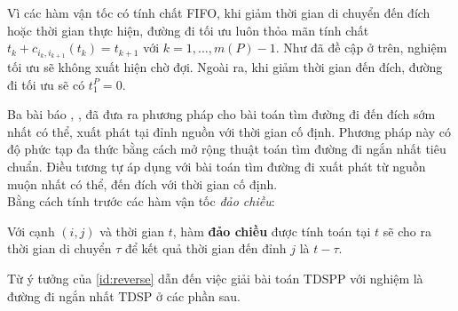\documentclass[../main.tex]{subfiles}
\begin{document}
Vì các hàm vận tốc có tính chất FIFO, khi giảm thời gian di
chuyển đến đích hoặc thời gian thực hiện, đường đi tối ưu luôn thỏa mãn
tính chất \(t_k + c_{i_k, i_{k+1}}(t_k) = t_{k+1}\) với
\(k = 1, \dots, m(P)-1\). Như đã đề cập ở trên, nghiệm tối ưu sẽ không
xuất hiện chờ đợi. Ngoài ra, khi giảm thời gian đến đích, đường đi tối
ưu sẽ có \(t_1^P = 0\).

Ba bài báo \cite{cooke1966shortest}, \cite{orda1990shortest}, \cite{dean2004shortest} đã đưa ra phương pháp
cho bài toán tìm đường đi đến đích sớm nhất có thể,  xuất phát tại đỉnh nguồn với thời gian cố định. 
Phương pháp này có độ phức tạp đa thức bằng cách mở rộng thuật toán tìm đường đi ngắn nhất
tiêu chuẩn. Điều tương tự áp dụng với bài toán tìm đường đi 
xuất phát từ nguồn muộn nhất có thể, đến đích với thời gian cố định.
\\
Bằng cách tính trước các hàm vận tốc \emph{đảo chiều}:

\begin{definition}
\label{id:reverse}  
Với
cạnh \((i, j)\) và thời gian \(t\), hàm \textbf{đảo chiều} được tính toán
tại \(t\) sẽ cho ra thời gian di chuyển \(\tau\) để kết quả thời gian
đến đỉnh \(j\) là \(t-\tau\). 
\end{definition}

Từ ý tưởng của \autoref{id:reverse} dẫn đến việc giải bài toán
TDSPP với nghiệm là đường đi ngắn nhất TDSP ở các phần sau.

\backmatter
\end{document}
